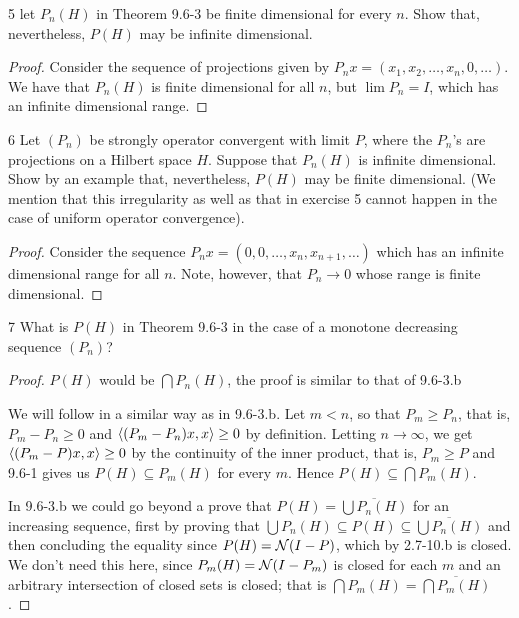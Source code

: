 \begin{exercise}{5}
let $P_n(H)$ in Theorem 9.6-3 be finite dimensional for every $n$.
Show that, nevertheless, $P(H)$ may be infinite dimensional.
\end{exercise}
\begin{proof}
Consider the sequence of projections given by $P_n x = (x_1, x_2, \dots, x_n, 0, \dots)$.
We have that $P_n(H)$ is finite dimensional for all $n$, but $\lim P_n = I$, which has an infinite dimensional range.
\end{proof} 

\begin{exercise}{6}
Let $(P_n)$ be strongly operator convergent with limit $P$, where the $P_n$'s are projections on a Hilbert space $H$.
Suppose that $P_n(H)$ is infinite dimensional.
Show by an example that, nevertheless, $P(H)$ may be finite dimensional.
(We mention that this irregularity as well as that in exercise 5 cannot happen in the case of uniform operator convergence).
\end{exercise}
\begin{proof}
Consider the sequence $P_n x = (0, 0, \dots, x_n, x_{n+1}, \dots)$ which has an infinite dimensional range for all $n$.
Note, however, that $P_n \to 0$ whose range is finite dimensional.
\end{proof} 

\begin{exercise}{7}
What is $P(H)$ in Theorem 9.6-3 in the case of a monotone decreasing sequence $(P_n)$?
\end{exercise}
\begin{proof}
$P(H)$ would be $\bigcap P_n(H)$, the proof is similar to that of 9.6-3.b

We will follow in a similar way as in 9.6-3.b.
Let $m < n$, so that $P_m \geq P_n$, that is, $P_m - P_n \geq 0$ and $\langle (P_m - P_n)x, x\rangle \geq 0$ by definition.
Letting $n \to \infty$, we get $\langle (P_m - P)x, x\rangle \geq 0$ by the continuity of the inner product, that is, $P_m \geq P$ and 9.6-1 gives us $P(H) \subseteq P_m(H)$ for every $m$.
Hence $P(H) \subseteq \bigcap P_m(H)$.

In 9.6-3.b we could go beyond a prove that $P(H) = \overline{\bigcup P_n(H)}$ for an increasing sequence, first by proving that $\bigcup P_n(H) \subseteq P(H) \subseteq \overline{\bigcup P_n(H)}$ and then concluding the equality since $P(H) = \mathcal{N}(I - P)$, which by 2.7-10.b is closed.
We don't need this here, since $P_m(H) = \mathcal{N}(I - P_m)$ is closed for each $m$ and an arbitrary intersection of closed sets is closed;
that is $\bigcap P_m(H) = \overline{\bigcap P_m(H)}$.
\end{proof} 

